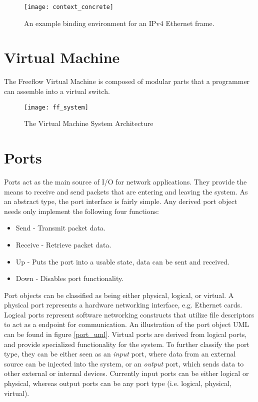 \begin{figure}[h]
\centering
\texttt{[image: context\_concrete]}
\caption{An example binding environment for an IPv4 Ethernet frame.}
\label{context_binding}
\end{figure}

\section{Virtual Machine}
\label{vm}
The Freeflow Virtual Machine is composed of modular parts that a programmer can
assemble into a virtual switch.

\begin{figure}[h]
\centering
\texttt{[image: ff\_system]}
\caption{The Virtual Machine System Architecture}
\label{ff_system}
\end{figure}

\section{Ports}
\label{vm:port}
Ports act as the main source of I/O for network applications. They provide the
means to receive and send packets that are entering and leaving the system. As
an abstract type, the port interface is fairly simple. Any derived port object
needs only implement the following four functions:

\begin{itemize}
\item Send - Transmit packet data.
\item Receive - Retrieve packet data.
\item Up - Puts the port into a usable state, data can be sent and received.
\item Down - Disables port functionality.
\end{itemize}

Port objects can be classified as being either physical, logical, or virtual. A
physical port represents a hardware networking interface, e.g. Ethernet cards.
Logical ports represent software networking constructs that utilize file
descriptors to act as a endpoint for communication. An illustration of the port
object UML can be found in figure \ref{port_uml}. Virtual ports are derived
from logical ports, and provide specialized functionality for the system. To
further classify the port type, they can be either seen as an \emph{input}
port, where data from an external source can be injected into the system, or an
\emph{output} port, which sends data to other external or internal devices.
Currently input ports can be either logical or physical, whereas output ports
can be any port type (i.e. logical, physical, virtual).

